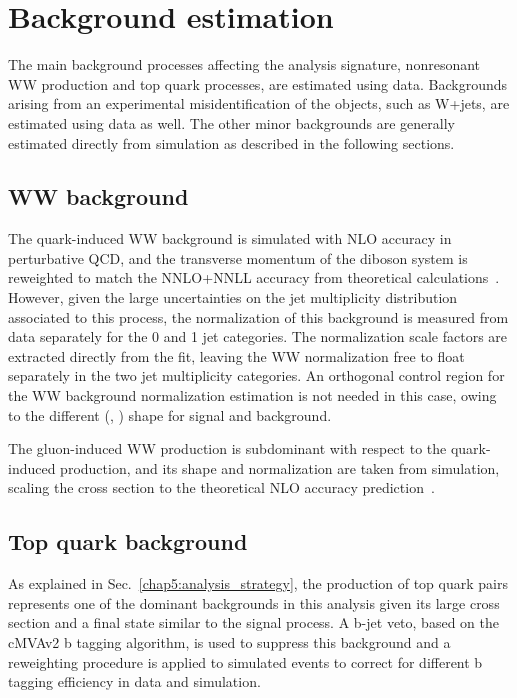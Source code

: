 \section{Background estimation}\label{chap5:backgrounds}

The main background processes affecting the analysis signature, nonresonant WW production and top quark processes, are estimated using data. Backgrounds arising from an experimental misidentification of the objects, such as W+jets, are estimated using data as well. The other minor backgrounds are generally estimated directly from simulation as described in the following sections.

\subsection{WW background}

The quark-induced WW background is simulated with NLO accuracy in perturbative QCD, and the transverse momentum of the diboson system is reweighted to match the NNLO+NNLL accuracy from theoretical calculations~\cite{Meade:2014fca,Jaiswal:2014yba}. However, given the large uncertainties on the jet multiplicity distribution associated to this process, the normalization of this background is measured from data separately for the 0 and 1 jet categories. The normalization scale factors are extracted directly from the fit, leaving the WW normalization free to float separately in the two jet multiplicity categories. An orthogonal control region for the WW background normalization estimation is not needed in this case, owing to the different (\mll, \mt) shape for signal and background.

The gluon-induced WW production is subdominant with respect to the quark-induced production, and its shape and normalization are taken from simulation, scaling the cross section to the theoretical NLO accuracy prediction~\cite{Caola:2015rqy}.

\subsection{Top quark background}

As explained in Sec.~\ref{chap5:analysis_strategy}, the production of top quark pairs represents one of the dominant backgrounds in this analysis given its large cross section and a final state similar to the signal process. A b-jet veto, based on the cMVAv2 b tagging algorithm, is used to suppress this background and a reweighting procedure is applied to simulated events to correct for different b tagging efficiency in data and simulation.

